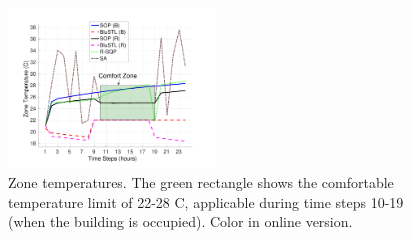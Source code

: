 \begin{figure}[t]
\centering
\includegraphics[width=0.49\textwidth]{figures/ZoneTempFinal}
\vspace{-20pt}
\caption{\small{Zone temperatures. The green rectangle shows the comfortable temperature limit of 22-28 C, applicable during time steps 10-19 (when the building is occupied). Color in online version.}}
\label{fig:ZoneTemp}
\vspace{-10pt}
\end{figure}
